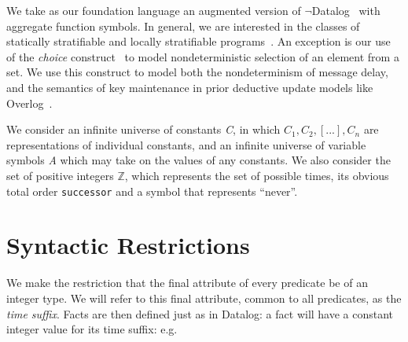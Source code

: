 \documentclass{acm_proc_article-sp-sigmod09}
\newcommand{\jmh}[1]{{\textcolor{red}{#1 -- jmh}}}
\newcommand{\dedalus}[1]{\texttt{\fontsize{9pt}{9pt}\selectfont #1}}
\begin{document}
We take as our foundation language an augmented version of \linebreak
$\lnot$Datalog~\cite{ullmanbook} with aggregate function
symbols.  In general, we are interested in the classes of statically
stratifiable and locally stratifiable programs~\cite{prz}.  An exception is our
use of the \emph{choice} construct~\cite{greedychoice, eventchoice} to model
nondeterministic selection of an element from a set.  We use this construct to
model both the nondeterminism of message delay, and the semantics of key
maintenance in prior deductive update models like Overlog~\cite{boon}.

We consider an infinite universe of constants \emph{C}, in which
$C_{1}, C_{2}, [...], C_{n}$ are representations of individual constants, and
an infinite universe of variable symbols \emph{A} which may take on the values
of any constants.   We also consider the set of positive integers $\mathbb{Z}$,
which represents the set of possible times, its obvious total order
\dedalus{successor} and a symbol that represents ``never''.

\section{Syntactic Restrictions}



We make the restriction that the final attribute of every predicate be of an integer type.  We will refer to this final attribute, common to all
predicates, as the \emph{time suffix}.  Facts are then defined just as in
Datalog: a fact will have a constant integer value for its time suffix: e.g.
\end{document}
